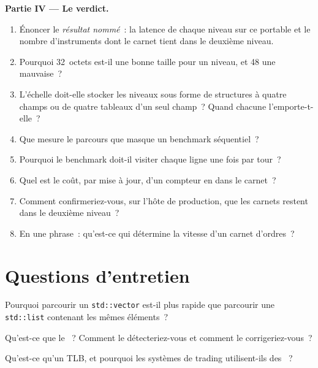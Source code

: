 \begin{problem}
\medskip\noindent\textbf{Partie IV --- Le verdict.}
\begin{enumerate}[resume]
\item Énoncer le \emph{résultat nommé}~: la latence de chaque niveau sur ce portable et le nombre d'instruments dont le carnet
tient dans le deuxième niveau.
\item Pourquoi 32~octets est-il une bonne taille pour un niveau, et 48 une mauvaise~?
\item L'échelle doit-elle stocker les niveaux sous forme de structures à quatre champs ou de quatre tableaux d'un seul champ~? Quand chacune l'emporte-t-elle~?
\item Que mesure le parcours que masque un benchmark séquentiel~?
\item Pourquoi le benchmark doit-il visiter chaque ligne une fois par tour~?
\item Quel est le coût, par mise à jour, d'un compteur en  dans le carnet~?
\item Comment confirmeriez-vous, sur l'hôte de production, que les carnets restent dans le deuxième niveau~?
\item En une phrase~: qu'est-ce qui détermine la vitesse d'un carnet d'ordres~?
\end{enumerate}
\end{problem}

\section{Questions d'entretien}

\begin{interviewq}\label{iq:ll:memory-hierarchy-and-caches:1}
Pourquoi parcourir un \texttt{std::vector} est-il plus rapide que parcourir une \texttt{std::list} contenant les mêmes éléments~?
\end{interviewq}

\begin{interviewq}\label{iq:ll:memory-hierarchy-and-caches:2}
Qu'est-ce que le ~? Comment le détecteriez-vous et comment le corrigeriez-vous~?
\end{interviewq}

\begin{interviewq}\label{iq:ll:memory-hierarchy-and-caches:3}
Qu'est-ce qu'un TLB, et pourquoi les systèmes de trading utilisent-ils des ~?
\end{interviewq}


